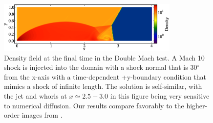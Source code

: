 \begin{figure}
\begin{center}
\includegraphics[width=0.8\textwidth]{figures/DoubleMachTest.eps}
\caption{Density field at the final time in the Double Mach test.  A
Mach 10 shock is injected into the domain with a shock normal that is
30$^\circ$ from the x-axis with a time-dependent +y-boundary condition
that mimics a shock of infinite length.  The solution is self-similar,
with the jet and whorls at $x \simeq 2.5-3.0$ in this figure being very sensitive
to numerical diffusion.  Our results compare favorably to the
higher-order images from \citet{1984JCoPh..54..115W}.}
\label{fig.doublemach}
\end{center}
\end{figure}
